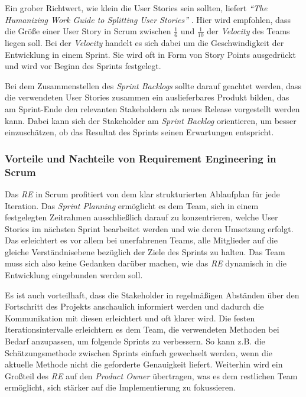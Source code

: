 \documentclass[acmtog]{acmart}
\begin{document}
Ein grober Richtwert, wie klein die User Stories sein sollten, liefert \emph{``The Humanizing Work Guide to Splitting User Stories''} \cite{humanizingwork}. Hier wird empfohlen, dass die Größe einer User Story in 
Scrum zwischen \( \frac{1}{6} \) und \( \frac{1}{10} \) der \emph{Velocity} des Teams liegen soll. Bei der \emph{Velocity} handelt 
es sich dabei um die Geschwindigkeit der Entwicklung in einem Sprint. Sie wird oft in Form von Story Points ausgedrückt und wird vor 
Beginn des Sprints festgelegt. \cite{humanizingwork}

Bei dem Zusammenstellen des \emph{Sprint Backlogs} sollte darauf geachtet werden, dass die verwendeten User Stories zusammen ein auslieferbares 
Produkt bilden, das am Sprint-Ende den relevanten Stakeholdern als neues Release vorgestellt werden kann. Dabei kann sich der Stakeholder 
am \emph{Sprint Backlog} orientieren, um besser einzuschätzen, ob das Resultat des Sprints seinen Erwartungen entspricht. \cite{reinscrum}

\subsubsection{Vorteile und Nachteile von Requirement Engineering in Scrum}

Das \emph{RE} in Scrum profitiert von dem klar strukturierten Ablaufplan für jede Iteration. Das \emph{Sprint Planning} ermöglicht es dem Team, sich in einem festgelegten Zeitrahmen 
ausschließlich darauf zu konzentrieren, welche User Stories im nächsten Sprint bearbeitet werden und wie deren Umsetzung erfolgt. Das erleichtert es vor 
allem bei unerfahrenen Teams, alle Mitglieder auf die gleiche Verständnisebene bezüglich der Ziele des Sprints zu halten. Das Team muss sich 
also keine Gedanken darüber machen, wie das \emph{RE} dynamisch in die Entwicklung eingebunden werden soll.

Es ist auch vorteilhaft, dass die Stakeholder in regelmäßigen Abständen über den Fortschritt des Projekts anschaulich informiert werden und 
dadurch die Kommunikation mit diesen erleichtert und oft klarer wird. Die festen Iterationsintervalle erleichtern es dem Team, die verwendeten Methoden bei 
Bedarf anzupassen, um folgende Sprints zu verbessern. So kann z.B. die Schätzungsmethode zwischen Sprints einfach gewechselt 
werden, wenn die aktuelle Methode nicht die geforderte Genauigkeit liefert.
Weiterhin wird ein Großteil des \emph{RE} auf den \emph{Product Owner} übertragen, was es dem restlichen Team ermöglicht, sich stärker auf die Implementierung zu fokussieren.
\end{document}
